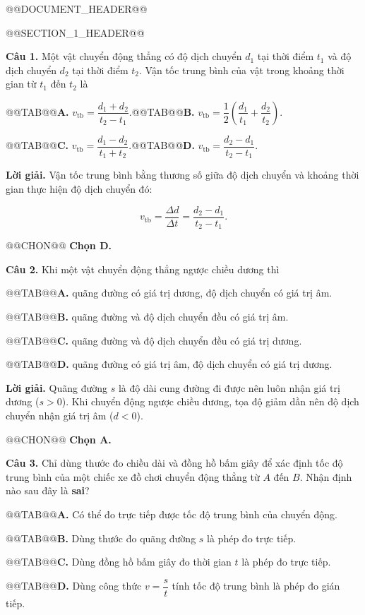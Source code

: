 \documentclass{article}
\begin{document}
@@DOCUMENT_HEADER@@

@@SECTION_1_HEADER@@

\textbf{Câu 1.} Một vật chuyển động thẳng có độ dịch chuyển $d_1$ tại thời điểm $t_1$ và độ dịch chuyển $d_2$ tại thời điểm $t_2$. Vận tốc trung bình của vật trong khoảng thời gian từ $t_1$ đến $t_2$ là

@@TAB@@\textbf{A.} $v_{\text{tb}} = \dfrac{d_1 + d_2}{t_2 - t_1}$.@@TAB@@\textbf{B.} $v_{\text{tb}} = \dfrac{1}{2}\left(\dfrac{d_1}{t_1} + \dfrac{d_2}{t_2}\right)$.

@@TAB@@\textbf{C.} $v_{\text{tb}} = \dfrac{d_1 - d_2}{t_1 + t_2}$.@@TAB@@\textbf{D.} $v_{\text{tb}} = \dfrac{d_2 - d_1}{t_2 - t_1}$.

\textbf{Lời giải.} Vận tốc trung bình bằng thương số giữa độ dịch chuyển và khoảng thời gian thực hiện độ dịch chuyển đó:

\[v_{\text{tb}} = \frac{\Delta d}{\Delta t} = \frac{d_2 - d_1}{t_2 - t_1}.\]

@@CHON@@ \textbf{Chọn D.}

\textbf{Câu 2.} Khi một vật chuyển động thẳng ngược chiều dương thì

@@TAB@@\textbf{A.} quãng đường có giá trị dương, độ dịch chuyển có giá trị âm.

@@TAB@@\textbf{B.} quãng đường và độ dịch chuyển đều có giá trị âm.

@@TAB@@\textbf{C.} quãng đường và độ dịch chuyển đều có giá trị dương.

@@TAB@@\textbf{D.} quãng đường có giá trị âm, độ dịch chuyển có giá trị dương.

\textbf{Lời giải.} Quãng đường $s$ là độ dài cung đường đi được nên luôn nhận giá trị dương ($s > 0$). Khi chuyển động ngược chiều dương, tọa độ giảm dần nên độ dịch chuyển nhận giá trị âm ($d < 0$).

@@CHON@@ \textbf{Chọn A.}

\textbf{Câu 3.} Chỉ dùng thước đo chiều dài và đồng hồ bấm giây để xác định tốc độ trung bình của một chiếc xe đồ chơi chuyển động thẳng từ $A$ đến $B$. Nhận định nào sau đây là \textbf{sai}?

@@TAB@@\textbf{A.} Có thể đo trực tiếp được tốc độ trung bình của chuyển động.

@@TAB@@\textbf{B.} Dùng thước đo quãng đường $s$ là phép đo trực tiếp.

@@TAB@@\textbf{C.} Dùng đồng hồ bấm giây đo thời gian $t$ là phép đo trực tiếp.

@@TAB@@\textbf{D.} Dùng công thức $v = \dfrac{s}{t}$ tính tốc độ trung bình là phép đo gián tiếp.
\end{document}
